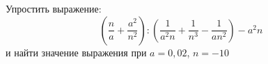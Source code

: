 \begin{ex}
	\begin{condition}
		Упростить выражение:
		\[ \left( \dfrac{n}{a}+\dfrac{a^2}{n^2} \right):\left( \dfrac{1}{a^2n}+\dfrac{1}{n^3}-\dfrac{1}{an^2} \right)-a^2n \]
		и найти значение выражения при \( a=0,02 \), \( n=-10 \)
	\end{condition}
\end{ex}